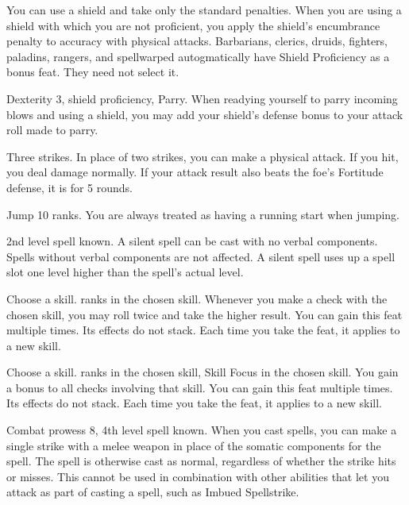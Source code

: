 \featben You can use a shield and take only the standard penalties.
When you are using a shield with which you are not proficient, you apply the shield's encumbrance penalty to accuracy with physical attacks.
Barbarians, clerics, druids, fighters, paladins, rangers, and spellwarped autogmatically have Shield Proficiency as a bonus feat.
They need not select it.

\featpres Dexterity 3, shield proficiency, Parry.
\featben When readying yourself to parry incoming blows and using a shield, you may add your shield's defense bonus to your attack roll made to parry.

\featpre Three strikes.
\featben In place of two strikes, you can make a physical attack.
If you hit, you deal damage normally.
If your attack result also beats the foe's Fortitude defense, it is \staggered for 5 rounds.

\featpre Jump 10 ranks.
\featben You are always treated as having a running start when jumping.

\featpre 2nd level spell known.
\featben A silent spell can be cast with no verbal components.
Spells without verbal components are not affected.
A silent spell uses up a spell slot one level higher than the spell's actual level.

Choose a skill.
 ranks in the chosen skill.
\featben Whenever you make a check with the chosen skill, you may roll twice and take the higher result.
You can gain this feat multiple times.
Its effects do not stack.
Each time you take the feat, it applies to a new skill.

Choose a skill.
 ranks in the chosen skill, Skill Focus in the chosen skill.
\featben You gain a  bonus to all checks involving that skill.
You can gain this feat multiple times.
Its effects do not stack.
Each time you take the feat, it applies to a new skill.

\featpres Combat prowess 8, 4th level spell known.
\featben When you cast spells, you can make a single strike with a melee weapon in place of the somatic components for the spell.
The spell is otherwise cast as normal, regardless of whether the strike hits or misses.
This cannot be used in combination with other abilities that let you attack as part of casting a spell, such as Imbued Spellstrike.

